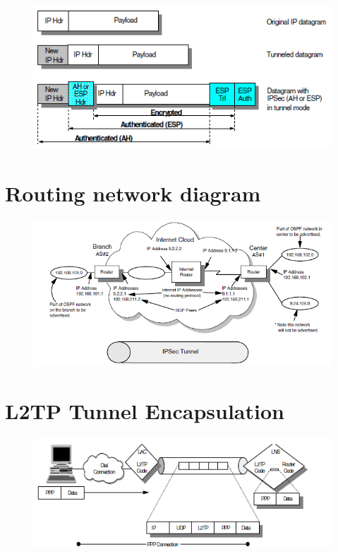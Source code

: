 \documentclass[10pt,a4paper]{article}
\begin{document}
\begin{figure}[hbtp]
\centering
\includegraphics[scale=1]{IPSec - tunnel mode.png}
\end{figure}



\newpage
\section{Routing network diagram}
\begin{figure}[hbtp]
\begin{flushleft}
\includegraphics[scale=1]{Routing network diagram.png}
\end{flushleft}
\end{figure}


\newpage
\section{L2TP Tunnel Encapsulation}

\begin{figure}[hbtp]
\centering
\includegraphics[scale=1]{L2TP Tunnel Encapsulation.png}
\end{figure}
\newpage
\end{document}
